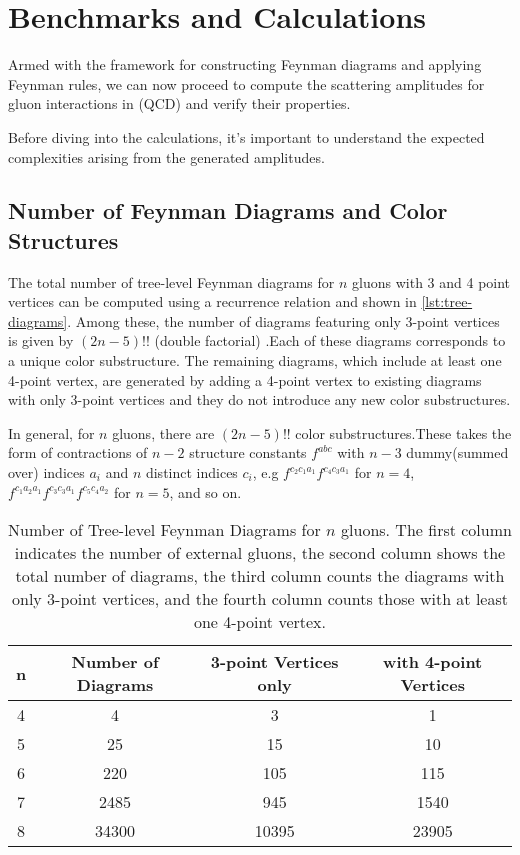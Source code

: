 \documentclass[main.tex]{subfiles}
\begin{document}
\section{Benchmarks and Calculations}

Armed with the framework for constructing Feynman diagrams and applying Feynman rules, we can now proceed to compute the 
scattering amplitudes for gluon interactions in (QCD) and verify their properties. 

Before diving into the calculations, it's important to understand the expected complexities arising from the generated amplitudes.

\subsection{Number of Feynman Diagrams and Color Structures}

The total number of tree-level Feynman diagrams for $n$ gluons with 3 and 4 point vertices can be computed using a recurrence relation\cite{OEIS:A268163} and shown in \cref{lst:tree-diagrams}.
Among these, the number of diagrams featuring only 3-point vertices is given by $(2n-5)!!$ (double factorial) \cite{OEIS:A001147}.Each of these diagrams corresponds to a unique color substructure. 
The remaining diagrams, which include at least one 4-point vertex, are generated by adding a 4-point vertex to existing diagrams with only 3-point vertices and 
they do not introduce any new color substructures.

In general, for $n$ gluons, there are $(2n-5)!!$ color substructures.These takes the form of contractions of $n-2$ structure constants $f^{abc}$ with $n-3$ dummy(summed over) indices $a_i$ and $n$ distinct
indices $c_i$, e.g $f^{c_2 c_1 a_1}f^{c_4 c_3 a_1}$ for $n=4$, $f^{c_1 a_2 a_1} f^{c_3 c_3 a_1} f^{c_5 c_4 a_2}$ for $n=5$, and so on. 

\begin{table}[htbp]\centering
\caption{Number of Tree-level Feynman Diagrams for $n$ gluons. The first column indicates the number of external gluons,
the second column shows the total number of diagrams, the third column counts the diagrams with only 3-point vertices, and the fourth column counts those with at least one 4-point vertex.}
\label{tab:tree-diagrams}

    \begin{tabular}{|c|c|c|c|}
        \hline
        \textbf{n} & \textbf{Number of Diagrams} & \textbf{3-point Vertices only} & \textbf{with 4-point Vertices} \\
        \hline
        4 & 4 & 3 & 1 \\
        5 & 25 & 15 & 10 \\
        6 & 220 & 105 & 115 \\
        7 & 2485 & 945 & 1540 \\
        8 & 34300 & 10395 & 23905 \\
        \hline    
    \end{tabular}
\end{table}
\end{document}
